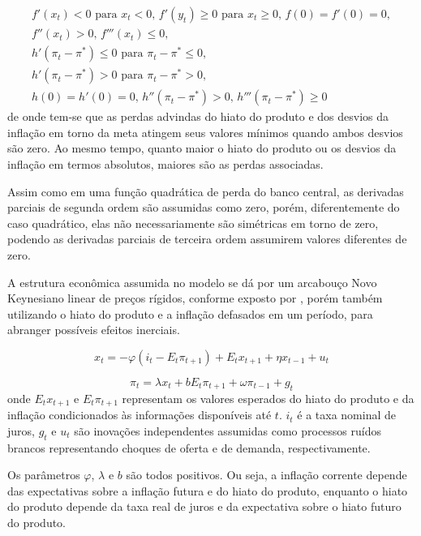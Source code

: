 \documentclass[
	article,			%
	11pt,				%
	oneside,			%
	a4paper,			%
	english,			%
	brazil,				%
	]{abntex2}
\begin{document}
	\begin{eqnarray}
		f'(x_t) < 0 \mbox{ para } x_t < 0 \mbox{, } f'(y_t) \geq 0 \mbox{ para } x_t \geq 0 \mbox{, } f(0) = f'(0) = 0,\nonumber \\
		f''(x_t)>0 \mbox{, } f'''(x_t) \leq 0,\nonumber \\
		h'(\pi_t-\pi^*) \leq 0 \mbox{ para } \pi_t - \pi^* \leq 0, \nonumber \\
		h'(\pi_t-\pi^*) > 0 \mbox{ para } \pi_t - \pi^* > 0, \nonumber \\
		h(0)=h'(0)=0 \mbox{, } h''(\pi_t-\pi^*)>0 \mbox{, } h'''(\pi_t-\pi^*) \geq 0
	\end{eqnarray}
	de onde tem-se que as perdas advindas do hiato do produto e dos desvios da inflação em torno da meta atingem seus valores mínimos quando ambos desvios são zero. Ao mesmo tempo, quanto maior o hiato do produto ou os desvios da inflação em termos absolutos, maiores são as perdas associadas. 
	
	Assim como em uma função quadrática de perda do banco central, as derivadas parciais de segunda ordem são assumidas como zero, porém, diferentemente do caso quadrático, elas não necessariamente são simétricas em torno de zero, podendo as derivadas parciais de terceira ordem assumirem valores diferentes de zero.
	
	A estrutura econômica assumida no modelo se dá por um arcabouço Novo Keynesiano linear de preços rígidos, conforme exposto por , porém também utilizando o hiato do produto e a inflação defasados em um período, para abranger possíveis efeitos inerciais.
		
	\begin{equation}  \label{curva_is}
		x_t=-\varphi(i_t-E_t\pi_{t+1}) + E_tx_{t+1} + \eta x_{t-1} + u_t
	\end{equation}
	
	\begin{equation} \label{curva_phillips}
		\pi_t = \lambda x_t + bE_t\pi_{t+1} + \omega \pi_{t-1} + g_t
	\end{equation}
%
	onde $E_tx_{t+1}$ e $E_t\pi_{t+1}$ representam os valores esperados do hiato do produto e da inflação condicionados às informações disponíveis até $t$. $i_t$ é a taxa nominal de juros, $g_t$ e $u_t$ são inovações independentes assumidas como processos ruídos brancos representando choques de oferta e de demanda, respectivamente. 
	
	Os parâmetros $\varphi$, $\lambda$ e $b$ são todos positivos. Ou seja, a inflação corrente depende das expectativas sobre a inflação futura e do hiato do produto, enquanto o hiato do produto depende da taxa real de juros e da expectativa sobre o hiato futuro do produto.
	
\end{document}
